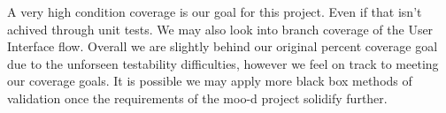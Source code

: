 A very high condition coverage is our goal for this project. Even if that isn't achived through unit tests. We may also look into branch coverage of the User Interface flow. Overall we are slightly behind our original percent coverage goal due to the unforseen testability difficulties, however we feel on track to meeting our coverage goals. It is possible we may apply more black box methods of validation once the requirements of the moo-d project solidify further. 


